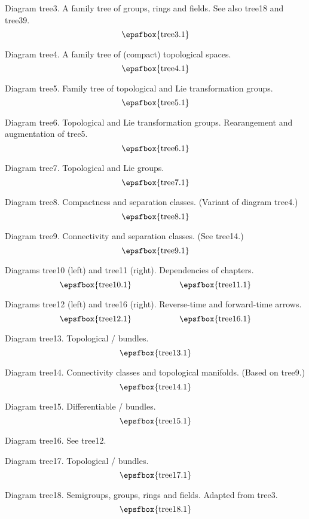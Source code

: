 Diagram tree3. A family tree of groups, rings and fields. See also tree18 and
tree39.
$$
\centerline{\epsfbox{tree3.1}}
$$

\filleject

Diagram tree4. A family tree of (compact) topological spaces.
$$
\centerline{\epsfbox{tree4.1}}
$$

Diagram tree5. Family tree of topological and Lie transformation groups.
$$
\centerline{\epsfbox{tree5.1}}
$$

Diagram tree6. Topological and Lie transformation groups. Rearangement and
augmentation of tree5.
$$
\centerline{\epsfbox{tree6.1}}
$$

Diagram tree7. Topological and Lie groups.
$$
\centerline{\epsfbox{tree7.1}}
$$

\filleject

Diagram tree8. Compactness and separation classes. (Variant of diagram tree4.)
$$
\centerline{\epsfbox{tree8.1}}
$$

Diagram tree9. Connectivity and separation classes. (See tree14.)
$$
\centerline{\epsfbox{tree9.1}}
$$

Diagrams tree10 (left) and tree11 (right). Dependencies of chapters.
$$
\centerline{\epsfbox{tree10.1}\hss\epsfbox{tree11.1}}
$$

\filleject

Diagrams tree12 (left) and tree16 (right). Reverse-time and forward-time arrows.
$$
\centerline{\epsfbox{tree12.1}\hss\epsfbox{tree16.1}}
$$

Diagram tree13. Topological \fibre/ bundles.
$$
\centerline{\epsfbox{tree13.1}}
$$

Diagram tree14. Connectivity classes and topological manifolds. (Based on
tree9.)
$$
\centerline{\epsfbox{tree14.1}}
$$

\filleject

Diagram tree15. Differentiable \fibre/ bundles.
$$
\centerline{\epsfbox{tree15.1}}
$$

Diagram tree16. See tree12.

Diagram tree17. Topological \fibre/ bundles.
$$
\centerline{\epsfbox{tree17.1}}
$$

Diagram tree18. Semigroups, groups, rings and fields. Adapted from tree3.
$$
\centerline{\epsfbox{tree18.1}}
$$

